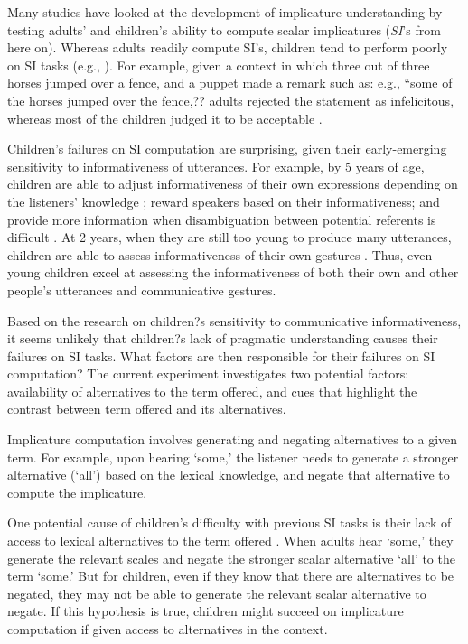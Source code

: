 \documentclass[10pt,letterpaper]{article}
\begin{document}
Many studies have looked at the development of implicature understanding by testing adults' and children's ability to compute scalar implicatures (\emph{SI}'s from here on). Whereas adults readily compute SI's, children tend to perform poorly on SI tasks (e.g., ). For example, given a context in which three out of three horses jumped over a fence, and a puppet made a remark such as: e.g., ``some of the horses jumped over the fence,?? adults rejected the statement as infelicitous, whereas most of the children judged it to be acceptable \cite{papafragou2003scalar}. %

Children's failures on SI computation are surprising, given their early-emerging sensitivity to informativeness of utterances. For example, by 5 years of age, children are able to adjust informativeness of their own expressions depending on the listeners' knowledge \cite{matthews2006effect}; reward speakers based on their informativeness\cite{katsos2011pragmatic}; and provide more information when disambiguation between potential referents is difficult \cite{matthews2012two}. At 2 years, when they are still too young to produce many utterances, children are able to assess informativeness of their own gestures \cite{o2001two}. Thus, even young children excel at assessing the informativeness of both their own and other people's utterances and communicative gestures. 

Based on the research on children?s sensitivity to communicative informativeness, it seems unlikely that children?s lack of pragmatic understanding causes their failures on SI tasks. What factors are then responsible for their failures on SI computation? The current experiment investigates two potential factors: availability of alternatives to the term offered, and cues that highlight the contrast between term offered and its alternatives. 

Implicature computation involves generating and negating alternatives to a given term. For example, upon hearing `some,' the listener needs to generate a stronger alternative (`all') based on the lexical knowledge, and negate that alternative to compute the implicature.  

One potential cause of children's difficulty with previous SI tasks is their lack of access to lexical alternatives to the term offered \cite{barner2011accessing}. When adults hear `some,' they generate the relevant scales and negate the stronger scalar alternative `all' to the term `some.' But for children, even if they know that there are alternatives to be negated, they may not be able to generate the relevant scalar alternative to negate. If this hypothesis is true, children might succeed on implicature computation if given access to alternatives in the context.
\end{document}
